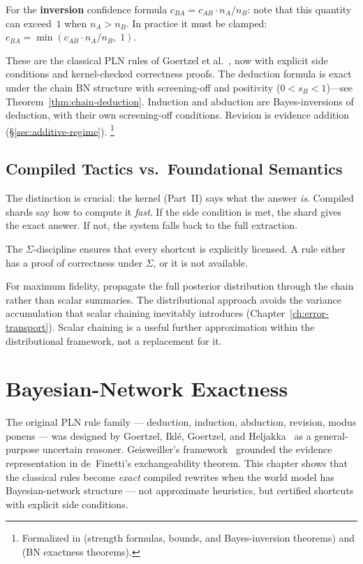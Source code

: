 \documentclass[11pt,openany]{report}
\begin{document}
\smallskip\noindent
For the \textbf{inversion} confidence formula
$c_{BA} = c_{AB} \cdot n_A / n_B$: note that this quantity can
exceed~$1$ when $n_A > n_B$.  In practice it must be clamped:
$c_{BA} = \min(c_{AB} \cdot n_A / n_B,\; 1)$.

\medskip

\noindent
These are the classical PLN rules of Goertzel et
al.~\cite{goertzel2009pln}, now with explicit side conditions and
kernel-checked correctness proofs.  The deduction formula is exact
under the chain BN structure with screening-off and positivity
($0 < s_B < 1$)---see Theorem~\ref{thm:chain-deduction}.
Induction and abduction are
Bayes-inversions of deduction, with their own screening-off
conditions.  Revision is evidence addition
(\S\ref{sec:additive-regime}).%
\footnote{Formalized in 
(strength formulas, bounds, and Bayes-inversion theorems) and
 (BN exactness
theorems).}

\section{Compiled Tactics vs.\ Foundational Semantics}

The distinction is crucial: the kernel (Part~II) says what the answer
\emph{is}.  Compiled shards say how to compute it \emph{fast}.  If
the side condition is met, the shard gives the exact answer.  If not,
the system falls back to the full extraction.

The $\Sigma$-discipline ensures that every shortcut is explicitly
licensed.  A rule either has a proof of correctness under $\Sigma$,
or it is not available.

For maximum fidelity, propagate the full posterior distribution
through the chain rather than scalar summaries.  The distributional
approach avoids the variance accumulation that scalar chaining
inevitably introduces (Chapter~\ref{ch:error-transport}).  Scalar
chaining is a useful further approximation within the distributional
framework, not a replacement for it.


\chapter{Bayesian-Network Exactness}
\label{ch:bn-models}

The original PLN rule family --- deduction, induction, abduction,
revision, modus ponens --- was designed by Goertzel, Iklé, Goertzel,
and Heljakka~\cite{goertzel2009pln} as a general-purpose uncertain
reasoner.  Geisweiller's \nuPLN{} framework~\cite{nuPLN2026} grounded
the evidence representation in de~Finetti's exchangeability theorem.
This chapter shows that the classical rules become \emph{exact}
compiled rewrites when the world model has Bayesian-network structure
--- not approximate heuristics, but certified shortcuts with explicit
side conditions.
\end{document}
